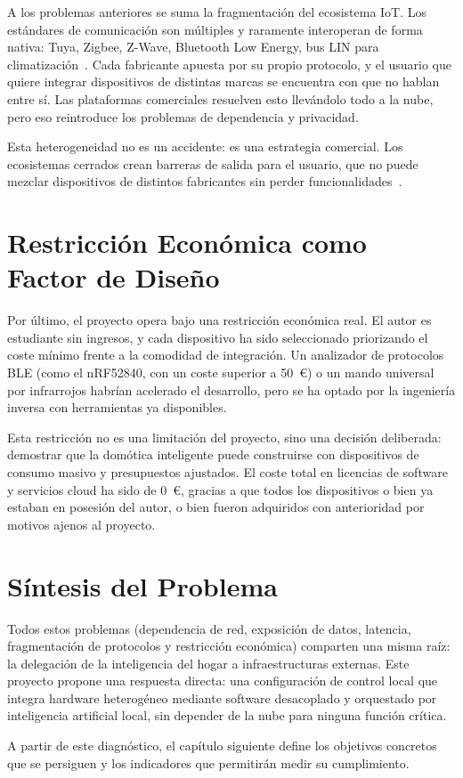 A los problemas anteriores se suma la fragmentación del ecosistema IoT. Los estándares de comunicación son múltiples y raramente interoperan de forma nativa: Tuya, Zigbee, Z-Wave, Bluetooth Low Energy, bus LIN para climatización~\cite{iso_17987_2025}. Cada fabricante apuesta por su propio protocolo, y el usuario que quiere integrar dispositivos de distintas marcas se encuentra con que no hablan entre sí. Las plataformas comerciales resuelven esto llevándolo todo a la nube, pero eso reintroduce los problemas de dependencia y privacidad.

Esta heterogeneidad no es un accidente: es una estrategia comercial. Los ecosistemas cerrados crean barreras de salida para el usuario, que no puede mezclar dispositivos de distintos fabricantes sin perder funcionalidades~\cite{home_assistant_2019}.

\section{Restricción Económica como Factor de Diseño}

Por último, el proyecto opera bajo una restricción económica real. El autor es estudiante sin ingresos, y cada dispositivo ha sido seleccionado priorizando el coste mínimo frente a la comodidad de integración. Un analizador de protocolos BLE (como el nRF52840, con un coste superior a 50~\euro{}) o un mando universal por infrarrojos habrían acelerado el desarrollo, pero se ha optado por la ingeniería inversa con herramientas ya disponibles.

Esta restricción no es una limitación del proyecto, sino una decisión deliberada: demostrar que la domótica inteligente puede construirse con dispositivos de consumo masivo y presupuestos ajustados. El coste total en licencias de software y servicios cloud ha sido de 0~\euro{}, gracias a que todos los dispositivos o bien ya estaban en posesión del autor, o bien fueron adquiridos con anterioridad por motivos ajenos al proyecto.

\section{Síntesis del Problema}

Todos estos problemas (dependencia de red, exposición de datos, latencia, fragmentación de protocolos y restricción económica) comparten una misma raíz: la delegación de la inteligencia del hogar a infraestructuras externas. Este proyecto propone una respuesta directa: una configuración de control local que integra hardware heterogéneo mediante software desacoplado y orquestado por inteligencia artificial local, sin depender de la nube para ninguna función crítica.

A partir de este diagnóstico, el capítulo siguiente define los objetivos concretos que se persiguen y los indicadores que permitirán medir su cumplimiento.
